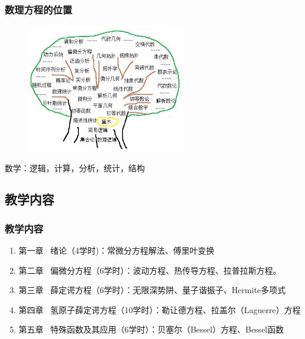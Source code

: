\begin{frame}
	\frametitle{数理方程的位置}
	\begin{center}
		\begin{figure}
			\includegraphics[width=7cm]{figs/fig1-1.png}	
		\end{figure}
		{ 数学：逻辑，计算，分析，统计，结构}
	\end{center}
\end{frame}

\subsection{教学内容}

\begin{frame}
	\frametitle{教学内容}
	\begin{enumerate}
			\item 第一章 ~绪论（4学时)：常微分方程解法、傅里叶变换
			 \vspace{0.2cm}
			 \item 第二章~ 偏微分方程（6学时）：波动方程、热传导方程、拉普拉斯方程。
			 \vspace{0.2cm}
			 \item 第三章 ~薛定谔方程（6学时）：无限深势阱、量子谐振子、Hermite多项式
            \vspace{0.2cm}
            \item 第四章 ~氢原子薛定谔方程（10学时）：勒让德方程、拉盖尔（Laguerre）方程
            \vspace{0.2cm}
            \item 第五章~ 特殊函数及其应用（6学时）：贝塞尔（Bessel）方程、Bessel函数
     \end{enumerate}	
\end{frame}

